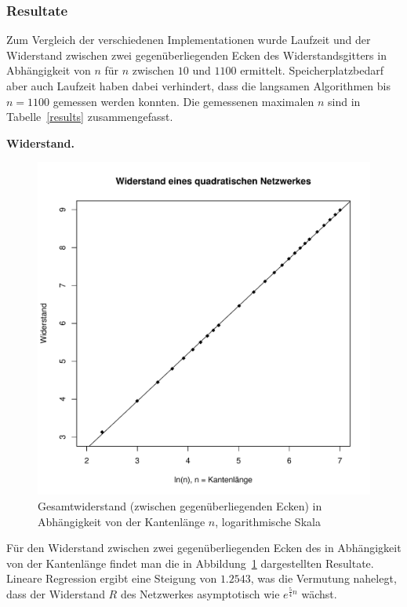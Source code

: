 \subsubsection{Resultate}
Zum Vergleich der verschiedenen Implementationen wurde Laufzeit
und der Widerstand zwischen zwei gegenüberliegenden Ecken des
Widerstandsgitters in Abhängigkeit von $n$ für $n$ zwischen $10$ und
$1100$ ermittelt. Speicherplatzbedarf aber auch Laufzeit haben dabei
verhindert, dass die langsamen Algorithmen bis $n=1100$ gemessen werden
konnten. Die gemessenen maximalen $n$ sind in Tabelle~\ref{results}
zusammengefasst.

\medskip
{\parindent0pt
{\bf Widerstand.}}
\begin{figure}
\begin{center}
\includegraphics[width=\hsize]{graphics/resistance}
\end{center}
\caption{Gesamtwiderstand (zwischen gegenüberliegenden Ecken)
in Abhängigkeit von der Kantenlänge $n$,
logarithmische Skala\label{resistance}}
\end{figure}
Für den Widerstand zwischen zwei gegenüberliegenden Ecken des
in Abhängigkeit von der Kantenlänge findet man die in
Abbildung~\ref{resistance} dargestellten Resultate. Lineare Regression 
ergibt eine Steigung von $1.2543$, was die Vermutung nahelegt, dass der
Widerstand $R$ des Netzwerkes asymptotisch wie $e^{\frac54n}$ wächst.

